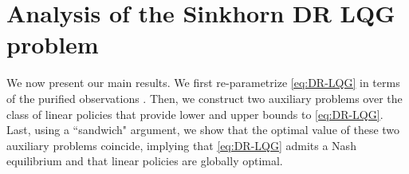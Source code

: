 \documentclass[letterpaper, 10 pt, conference]{ieeeconf}  %
\theoremstyle{ieeeconf}
\newtheorem{remark}{Remark}
\DeclareMathOperator{\Tr}{Tr}
\newcommand{\Prob}{\mathbb{P}}
\begin{document}
\section{Analysis of the Sinkhorn DR LQG problem}
\label{sec:analysis}
We now present our main results. We first re-parametrize \eqref{eq:DR-LQG} in terms of the purified observations \cite[Section 14.4.2]{ben2009robust}. Then, we construct two auxiliary problems over the class of linear policies that provide lower and upper bounds to \eqref{eq:DR-LQG}. Last, using a ``sandwich" argument, we show that the optimal value of these two auxiliary problems coincide, implying that \eqref{eq:DR-LQG} admits a Nash equilibrium and that linear policies are globally optimal.
\end{document}
